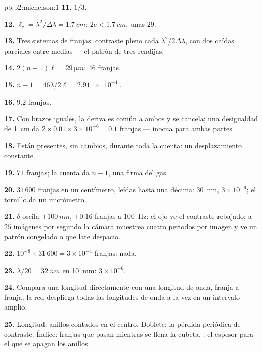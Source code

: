 \begin{solution}{pb:b2:michelson:1}
\textbf{11.} $1/3$.

\textbf{12.} $\ell_c = \lambda^2/\Delta\lambda = \qty{1.7}{cm}$: $2e < \qty{1.7}{cm}$, unas $29$.

\textbf{13.} Tres sistemas de franjas: contraste pleno cada $\lambda^2/2\Delta\lambda$, con
dos caídas parciales entre medias --- el patrón de tres rendijas.

\textbf{14.} $2(n - 1)\ell = \qty{29}{\micro m}$: $46$ franjas.

\textbf{15.} $n - 1 = 46\lambda/2\ell = \qty{2.91e-4}{}$.

\textbf{16.} $9.2$ franjas.

\textbf{17.} Con brazos iguales, la deriva es común a ambos y se cancela; una
desigualdad de \qty{1}{cm} da $2 \times 0.01 \times 3 \times 10^{-6} = 0.1$ franjas ---
inocua para ambas partes.

\textbf{18.} Están presentes, sin cambios, durante toda la cuenta: un
desplazamiento constante.

\textbf{19.} $71$ franjas; la cuenta da $n - 1$, una firma del gas.

\textbf{20.} $31\,600$ franjas en un centímetro, leídas hasta una décima:
\qty{30}{nm}, $3 \times 10^{-6}$; el tornillo da un micrómetro.

\textbf{21.} $\delta$ oscila $\pm\qty{100}{nm}$, $\pm0.16$ franjas a \qty{100}{Hz}: el
ojo ve el contraste rebajado; a $25$ imágenes por segundo la cámara
muestrea cuatro periodos por imagen y ve un patrón congelado o que late
despacio.

\textbf{22.} $10^{-8} \times 31\,600 = 3 \times 10^{-4}$ franjas: nada.

\textbf{23.} $\lambda/20 = \qty{32}{nm}$ en \qty{10}{mm}: $3 \times 10^{-6}$.

\textbf{24.} Compara una longitud directamente con una longitud de onda, franja a
franja; la red despliega todas las longitudes de onda a la vez en un intervalo amplio.

\textbf{25.} Longitud: anillos contados en el centro. Doblete: la
pérdida periódica de contraste. Índice: franjas que pasan mientras se llena
la cubeta. : el espesor para el que se apagan los anillos.
\end{solution}
